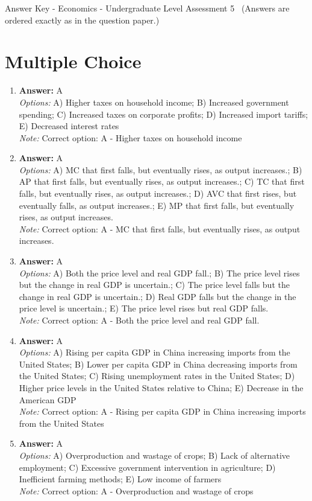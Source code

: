\documentclass[12pt]{article}
\begin{document}
\begin{center}
Answer Key - Economics - Undergraduate Level Assessment 5 \
\small (Answers are ordered exactly as in the question paper.)
\end{center}

\section*{Multiple Choice}
\begin{enumerate}[label=\arabic*.]
\item \textbf{Answer:} A
\\ \textit{Options:} A) Higher taxes on household income; B) Increased government spending; C) Increased taxes on corporate profits; D) Increased import tariffs; E) Decreased interest rates
\\ \textit{Note:} Correct option: A - Higher taxes on household income
\item \textbf{Answer:} A
\\ \textit{Options:} A) MC that first falls, but eventually rises, as output increases.; B) AP that first falls, but eventually rises, as output increases.; C) TC that first falls, but eventually rises, as output increases.; D) AVC that first rises, but eventually falls, as output increases.; E) MP that first falls, but eventually rises, as output increases.
\\ \textit{Note:} Correct option: A - MC that first falls, but eventually rises, as output increases.
\item \textbf{Answer:} A
\\ \textit{Options:} A) Both the price level and real GDP fall.; B) The price level rises but the change in real GDP is uncertain.; C) The price level falls but the change in real GDP is uncertain.; D) Real GDP falls but the change in the price level is uncertain.; E) The price level rises but real GDP falls.
\\ \textit{Note:} Correct option: A - Both the price level and real GDP fall.
\item \textbf{Answer:} A
\\ \textit{Options:} A) Rising per capita GDP in China increasing imports from the United States; B) Lower per capita GDP in China decreasing imports from the United States; C) Rising unemployment rates in the United States; D) Higher price levels in the United States relative to China; E) Decrease in the American GDP
\\ \textit{Note:} Correct option: A - Rising per capita GDP in China increasing imports from the United States
\item \textbf{Answer:} A
\\ \textit{Options:} A) Overproduction and wastage of crops; B) Lack of alternative employment; C) Excessive government intervention in agriculture; D) Inefficient farming methods; E) Low income of farmers
\\ \textit{Note:} Correct option: A - Overproduction and wastage of crops
\end{enumerate}
\end{document}
